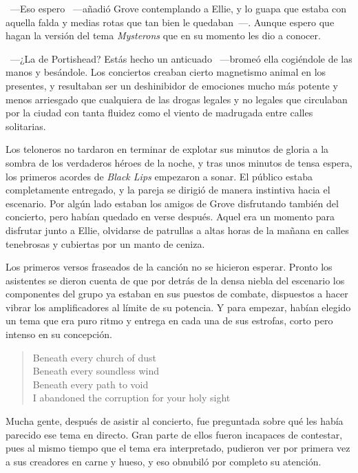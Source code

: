 ~---Eso espero ~---añadió Grove contemplando a Ellie, y lo guapa que estaba con aquella falda y medias rotas que tan bien le quedaban~---. Aunque espero que hagan la versión del tema \emph{Mysterons} que en su momento les dio a conocer.

~---¿La de Portishead? Estás hecho un anticuado ~---bromeó ella cogiéndole de las manos y besándole. Los conciertos creaban cierto magnetismo animal en los presentes, y resultaban ser un deshinibidor de emociones mucho más potente y menos arriesgado que cualquiera de las drogas legales y no legales que circulaban por la ciudad con tanta fluidez como el viento de madrugada entre calles solitarias.

Los teloneros no tardaron en terminar de explotar sus minutos de gloria a la sombra de los verdaderos héroes de la noche, y tras unos minutos de tensa espera, los primeros acordes de \emph{Black Lips} empezaron a sonar. El público estaba completamente entregado, y la pareja se dirigió de manera instintiva hacia el escenario. Por algún lado estaban los amigos de Grove disfrutando también del concierto, pero habían quedado en verse después. Aquel era un momento para disfrutar junto a Ellie, olvidarse de patrullas a altas horas de la mañana en calles tenebrosas y cubiertas por un manto de ceniza.

Los primeros versos fraseados de la canción no se hicieron esperar. Pronto los asistentes se dieron cuenta de que por detrás de la densa niebla del escenario los componentes del grupo ya estaban en sus puestos de combate, dispuestos a hacer vibrar los amplificadores al límite de su potencia. Y para empezar, habían elegido un tema que era puro ritmo y entrega en cada una de sus estrofas, corto pero intenso en su concepción.

\begin{verse}
    \begin{em}
        Beneath every church of dust\\
        Beneath every soundless wind\\
        Beneath every path to void\\
        I abandoned the corruption for your holy sight
    \end{em}
\end{verse}

Mucha gente, después de asistir al concierto, fue preguntada sobre qué les había parecido ese tema en directo. Gran parte de ellos fueron incapaces de contestar, pues al mismo tiempo que el tema era interpretado, pudieron ver por primera vez a sus creadores en carne y hueso, y eso obnubiló por completo su atención.

